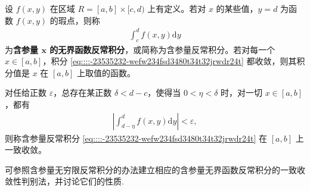 \documentclass[../../main.tex]{subfiles}
\begin{document}
\begin{definition}
设 \( f(x,y) \) 在区域 \( R = [a,b] \times [c,d) \) 上有定义。若对 \( x \) 的某些值，\( y = d \) 为函数 \( f(x,y) \) 的瑕点，则称
\begin{align}\label{eq::::-23535232-wefw234fsd3480t34t32jrwdr24t}
\int_{c}^{d} f(x,y) \mathrm{d}y
\end{align}
为\textbf{含参量 \( \boldsymbol{x} \) 的无界函数反常积分}，或简称为含参量反常积分。若对每一个 \( x \in [a,b] \)，积分 \eqref{eq::::-23535232-wefw234fsd3480t34t32jrwdr24t} 都收敛，则其积分值是 \( x \) 在 \( [a,b] \) 上取值的函数。
\end{definition}

\begin{definition}
对任给正数 \( \varepsilon \)，总存在某正数 \( \delta < d - c \)，使得当 \( 0 < \eta < \delta \) 时，对一切 \( x \in [a,b] \)，都有
\begin{align*}
\left| \int_{d - \eta}^{d} f(x,y) \mathrm{d}y \right| < \varepsilon,
\end{align*}
则称含参量反常积分 \eqref{eq::::-23535232-wefw234fsd3480t34t32jrwdr24t} 在 \( [a,b] \) 上一致收敛。
\end{definition}
\begin{note}
可参照含参量无穷限反常积分的办法建立相应的含参量无界函数反常积分的一致收敛性判别法，并讨论它们的性质.
\end{note}
\end{document}
